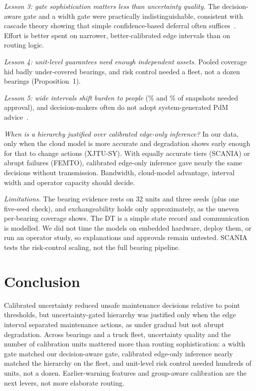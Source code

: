 \documentclass[conference]{IEEEtran}
\begin{document}
\textit{Lesson 3: gate sophistication matters less than uncertainty quality.} The decision-aware gate and a width gate were practically indistinguishable, consistent with cascade theory showing that simple confidence-based deferral often suffices~\cite{jitkrittum2023cascade}. Effort is better spent on narrower, better-calibrated edge intervals than on routing logic.

\textit{Lesson 4: unit-level guarantees need enough independent assets.} Pooled coverage hid badly under-covered bearings, and risk control needed a fleet, not a dozen bearings (Proposition~1).

\textit{Lesson 5: wide intervals shift burden to people} (\feApprHera\% and \xjApprHera\% of snapshots needed approval), and decision-makers often do not adopt system-generated PdM advice~\cite{vanoudenhoven2023pdm5}.

\textit{When is a hierarchy justified over calibrated edge-only inference?} In our data, only when the cloud model is more accurate and degradation shows early enough for that to change actions (XJTU-SY). With equally accurate tiers (SCANIA) or abrupt failures (FEMTO), calibrated edge-only inference gave nearly the same decisions without transmission. Bandwidth, cloud-model advantage, interval width and operator capacity should decide.

\textit{Limitations.} The bearing evidence rests on 32 units and three seeds (plus one five-seed check), and exchangeability holds only approximately, as the uneven per-bearing coverage shows. The DT is a simple state record and communication is modelled. We did not time the models on embedded hardware, deploy them, or run an operator study, so explanations and approvals remain untested. SCANIA tests the risk-control scaling, not the full bearing pipeline.

\section{Conclusion}
Calibrated uncertainty reduced unsafe maintenance decisions relative to point thresholds, but uncertainty-gated hierarchy was justified only when the edge interval separated maintenance actions, as under gradual but not abrupt degradation. Across bearings and a truck fleet, uncertainty quality and the number of calibration units mattered more than routing sophistication: a width gate matched our decision-aware gate, calibrated edge-only inference nearly matched the hierarchy on the fleet, and unit-level risk control needed hundreds of units, not a dozen. Earlier-warning features and group-aware calibration are the next levers, not more elaborate routing.



\end{document}
